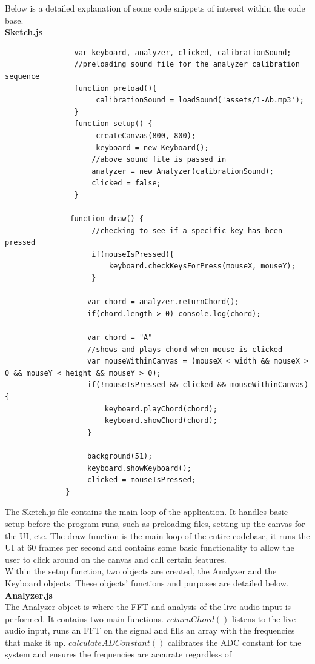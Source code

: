 \documentclass[12pt,a4paper]{article}
\begin{document}
			Below is a detailed explanation of some code snippets of interest within the code base.\\
			\textbf{Sketch.js}\\
			\normalsize
			\begin{lstlisting}
				var keyboard, analyzer, clicked, calibrationSound;
				//preloading sound file for the analyzer calibration sequence
				function preload(){
 					 calibrationSound = loadSound('assets/1-Ab.mp3');
				}
				function setup() {
				     createCanvas(800, 800);
  					 keyboard = new Keyboard();
  					//above sound file is passed in
  					analyzer = new Analyzer(calibrationSound);
  					clicked = false;
				}

			   function draw() {
  			   		//checking to see if a specific key has been pressed
  					if(mouseIsPressed){
    					keyboard.checkKeysForPress(mouseX, mouseY);
  			   		}

      			   var chord = analyzer.returnChord();
  				   if(chord.length > 0) console.log(chord);

		     	   var chord = "A"
				   //shows and plays chord when mouse is clicked
				   var mouseWithinCanvas = (mouseX < width && mouseX > 0 && mouseY < height && mouseY > 0);
				   if(!mouseIsPressed && clicked && mouseWithinCanvas){
					   keyboard.playChord(chord);
					   keyboard.showChord(chord);
				   }

		           background(51);
		           keyboard.showKeyboard();
		           clicked = mouseIsPressed;
		      }
			\end{lstlisting}
			The Sketch.js file contains the main loop of the application. It handles basic setup before the program runs, such as preloading files, setting up the canvas for the UI, etc.
			The draw function is the main loop of the entire codebase, it runs the UI at $60$ frames per second and contains some basic functionality to allow the user to click around on the
			canvas and call certain features.\\
			Within the setup function, two objects are created, the Analyzer and the Keyboard objects. These objects' functions and purposes are detailed below.
\newpage
			\textbf{Analyzer.js}\\
			\normalsize
			The Analyzer object is where the FFT and analysis of the live audio input is performed. It contains two main functions. $returnChord()$ listens to the live audio input, runs an FFT on the 
			signal and fills an array with the frequencies that make it up. $calculateADConstant()$ calibrates the ADC constant for the system and ensures the frequencies are accurate regardless of 
\end{document}

